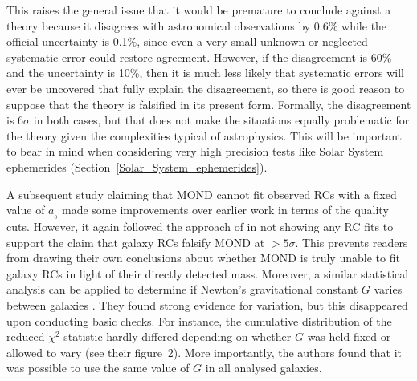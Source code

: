 \documentclass[fleqn,usenatbib,useAMS,onecolumn]{mnras} %
\begin{document}
This raises the general issue that it would be premature to conclude against a theory because it disagrees with astronomical observations by 0.6\% while the official uncertainty is 0.1\%, since even a very small unknown or neglected systematic error could restore agreement. However, if the disagreement is 60\% and the uncertainty is 10\%, then it is much less likely that systematic errors will ever be uncovered that fully explain the disagreement, so there is good reason to suppose that the theory is falsified in its present form. Formally, the disagreement is $6\sigma$ in both cases, but that does not make the situations equally problematic for the theory given the complexities typical of astrophysics. This will be important to bear in mind when considering very high precision tests like Solar System ephemerides (Section~\ref{Solar_System_ephemerides}).

A subsequent study claiming that MOND cannot fit observed RCs with a fixed value of $a_{_0}$ \citep{Marra_2020} made some improvements over earlier work in terms of the quality cuts. However, it again followed the approach of \citet{Rodrigues_2018} in not showing any RC fits to support the claim that galaxy RCs falsify MOND at $>5\sigma$. This prevents readers from drawing their own conclusions about whether MOND is truly unable to fit galaxy RCs in light of their directly detected mass. Moreover, a similar statistical analysis can be applied to determine if Newton's gravitational constant $G$ varies between galaxies \citep{Pengfei_Li_2021}. They found strong evidence for variation, but this disappeared upon conducting basic checks. For instance, the cumulative distribution of the reduced $\chi^2$ statistic hardly differed depending on whether $G$ was held fixed or allowed to vary (see their figure~2). More importantly, the authors found that it was possible to use the same value of $G$ in all analysed galaxies.
\end{document}
